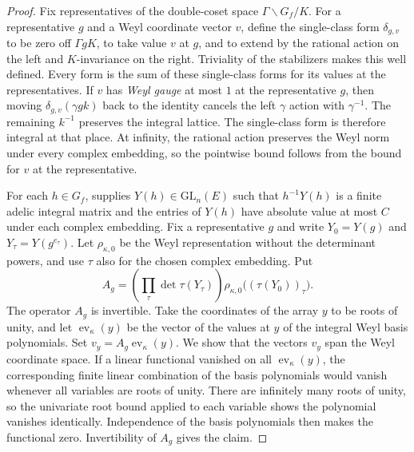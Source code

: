 \begin{proof}
Fix representatives of the double-coset space $\Gamma\backslash G_f/K$. For a representative $g$ and a Weyl coordinate vector $v$, define the single-class form $\delta_{g,v}$ to be zero off $\Gamma gK$, to take value $v$ at $g$, and to extend by the rational action on the left and $K$-invariance on the right. Triviality of the stabilizers makes this well defined. Every form is the sum of these single-class forms for its values at the representatives. If $v$ has \emph{Weyl gauge} at most $1$ at the representative $g$, then moving $\delta_{g,v}(\gamma gk)$ back to the identity cancels the left $\gamma$ action with $\gamma^{-1}$. The remaining $k^{-1}$ preserves the integral lattice. The single-class form is therefore integral at that place. At infinity, the rational action preserves the Weyl norm under every complex embedding, so the pointwise bound follows from the bound for $v$ at the representative.

For each $h\in G_f$,  supplies $Y(h)\in\mathrm{GL}_n(E)$ such that $h^{-1}Y(h)$ is a finite adelic integral matrix and the entries of $Y(h)$ have absolute value at most $C$ under each complex embedding. Fix a representative $g$ and write $Y_0=Y(g)$ and $Y_\tau=Y(g^{e_\tau})$. Let $\rho_{\kappa,0}$ be the Weyl representation without the determinant powers, and use $\tau$ also for the chosen complex embedding. Put
\[
 A_g=\left(\prod_\tau\det\tau(Y_\tau)\right)
      \rho_{\kappa,0}\bigl((\tau(Y_0))_\tau\bigr).
\]
The operator $A_g$ is invertible. Take the coordinates of the array $y$ to be roots of unity, and let $\operatorname{ev}_\kappa(y)$ be the vector of the values at $y$ of the integral Weyl basis polynomials. Set $v_y=A_g\operatorname{ev}_\kappa(y)$. We show that the vectors $v_y$ span the Weyl coordinate space. If a linear functional vanished on all $\operatorname{ev}_\kappa(y)$, the corresponding finite linear combination of the basis polynomials would vanish whenever all variables are roots of unity. There are infinitely many roots of unity, so the univariate root bound applied to each variable shows the polynomial vanishes identically. Independence of the basis polynomials then makes the functional zero. Invertibility of $A_g$ gives the claim.


\end{proof}
